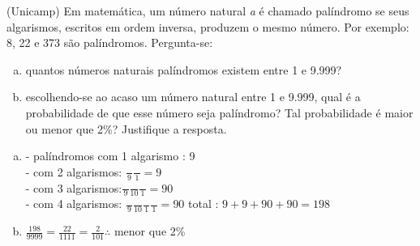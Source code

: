 \begin{ex}
(Unicamp) Em matemática, um número natural \textit{a} é chamado palíndromo se seus algarismos, escritos em ordem inversa, produzem o mesmo número. Por exemplo: 8, 22 e 373 são palíndromos. Pergunta-se:
   \begin{enumerate}[(a)]
   \item quantos números naturais palíndromos existem entre 1 e 9.999?
   \item escolhendo-se ao acaso um número natural entre 1 e 9.999, qual é a probabilidade de que esse número seja palíndromo? Tal probabilidade é maior ou menor que 2\%? Justifique a resposta.
   \end{enumerate}
     \begin{sol}
      \phantom{A}
       \begin{enumerate} [(a)]
           \item - palíndromos com 1 algarismo : 9 \\
           - com 2 algarismos: $\frac{\phantom{A}}{9}\frac{\phantom{A}}{1}=9$\\
           - com 3 algarismos:$\frac{\phantom{A}}{9}\frac{\phantom{A}}{10}\frac{\phantom{A}}{1}=90$ \\
           - com 4 algarismos: $\frac{\phantom{A}}{9}\frac{\phantom{A}}{10}\frac{\phantom{A}}{1}\frac{\phantom{A}}{1}=90$ \hspace{0,3cm}
           total : $9+9+90+90=198$
           \item $\frac{198}{9999}=\frac{22}{1111}=\frac{2}{101}\therefore$ \hspace{0,2cm} menor que 2\%
       \end{enumerate}
     \end{sol}
\end{ex}